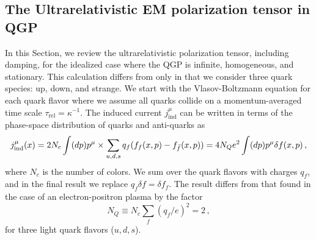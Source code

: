 \subsection{The Ultrarelativistic EM polarization tensor in QGP}\label{sec:linresp}

In this Section, we review the ultrarelativistic polarization tensor, including damping, for the idealized case where the QGP is infinite, homogeneous, and stationary. This calculation differs from \cite{Formanek:2021blc} only in that we consider three quark species: up, down, and strange. We start with the Vlasov-Boltzmann equation for each quark flavor  where we assume all quarks collide on a momentum-averaged time scale $\tau_{\text{rel}} = \kappa^{-1}$. The induced current $ j_{\mathrm{ind}}^\mu$ can be written in terms of the phase-space distribution of quarks and anti-quarks as
\begin{equation}\label{eq:current}
   j_{\mathrm{ind}}^\mu(x) = 2 N_c \int (dp)p^\mu \\ \times \sum_{u,d,s} q_f (f_{f}(x,p) - f_{\bar{f}}(x,p))=  4 N_Q e^2 \int (dp)p^\mu \delta f(x,p)\,,
\end{equation}
where  $N_c$ is the number of colors. We sum over the quark flavors with charges $q_f$, and in the final result we replace $q_f \delta f = \delta f_f$. The result  differs from that found in the case of an electron-positron plasma by the factor
\begin{equation}
N_Q \equiv N_c\sum_f (q_f/e)^2 = 2\,,
\end{equation}
for three light quark flavors ($u,d,s$).

